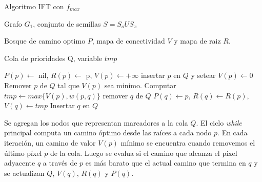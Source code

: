 \documentclass[a4paper,10pt]{article}
\begin{document}
\begin{algorithm}
    \caption{Algoritmo IFT con $f_{max}$}
    \label{fig:IFTrace-IFT-algorithm}
    \begin{algorithmic}
        \Require\hspace{\algorithmicindent}\hspace{\algorithmicindent}Grafo $G_{1}$, conjunto de semillas $S = S_{o} U S_{x}$

        \Ensure \hspace{\algorithmicindent}\hspace{0.23cm} Bosque de camino optimo $P$, mapa de conectividad $V$
        \State\hspace{\algorithmicindent}\hspace{\algorithmicindent}\hspace{\algorithmicindent}\hspace{0.3cm} y mapa de raiz $R$.

        \Auxiliary\hspace{\algorithmicindent} Cola de prioridades Q, variable $tmp$

        \State

            \State $P(p) \gets$ nil, $R(p) \gets$ p, $V(p) \gets + \infty$
             insertar $p$ en $Q$ y setear $V(p) \gets 0$ \EndIf
        \EndFor
            \State Remover $p$ de $Q$ tal que $V(p)$ sea minimo.
                \State Computar $tmp \gets max\{V(p), w(p,q)\}$
                     remover $q$ de $Q$ \EndIf
                    \State $P(q) \gets p$, $R(q) \gets R(p)$, $V(q) \gets tmp$
                    \State Insertar $q$ en $Q$
                \EndIf
            \EndFor
        \EndWhile
    \end{algorithmic}
\end{algorithm}



Se agregan
los nodos que representan marcadores a la cola $Q$. El ciclo \textit{while}
principal computa un camino óptimo desde las raíces a cada nodo $p$. En
cada iteración, un camino de valor $V(p)$ mínimo se encuentra cuando
removemos el último píxel $p$ de la cola. Luego se evalua si el camino que
alcanza el píxel adyacente $q$ a través de $p$ es más barato que el actual
camino que termina en $q$ y se actualizan $Q$, $V(q)$, $R(q)$ y $P(q)$.
\end{document}

